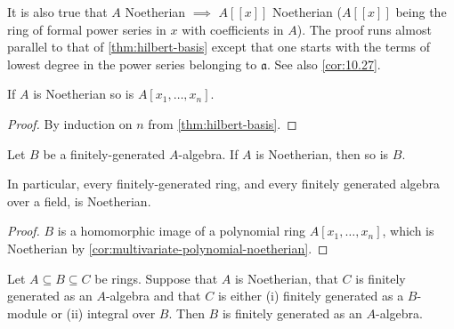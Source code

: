 \begin{remark}\label{rem:power-series-noetherian}
It is also true that $A$ Noetherian $\implies$ $A[[x]]$ Noetherian ($A[[x]]$ being the ring of formal power series in $x$ with coefficients in $A$). The proof runs almost parallel to that of \eqref{thm:hilbert-basis} except that one starts with the terms of lowest degree in the power series belonging to $\mathfrak{a}$. See also \eqref{cor:10.27}.
\end{remark}

\begin{corollary}\label{cor:multivariate-polynomial-noetherian}
If $A$ is Noetherian so is $A[x_1, \ldots, x_n]$.
\end{corollary}

\begin{proof}
By induction on $n$ from \eqref{thm:hilbert-basis}.
\end{proof}

\begin{corollary}\label{cor:finitely-generated-algebra-noetherian}
Let $B$ be a finitely-generated $A$-algebra. If $A$ is Noetherian, then so is $B$.

In particular, every finitely-generated ring, and every finitely generated algebra over a field, is Noetherian.
\end{corollary}

\begin{proof}
$B$ is a homomorphic image of a polynomial ring $A[x_1, \ldots, x_n]$, which is Noetherian by \eqref{cor:multivariate-polynomial-noetherian}.
\end{proof}

\begin{proposition}\label{prop:artin-tate}
Let $A \subseteq B \subseteq C$ be rings. Suppose that $A$ is Noetherian, that $C$ is finitely generated as an $A$-algebra and that $C$ is either (i) finitely generated as a $B$-module or (ii) integral over $B$. Then $B$ is finitely generated as an $A$-algebra.
\end{proposition}

